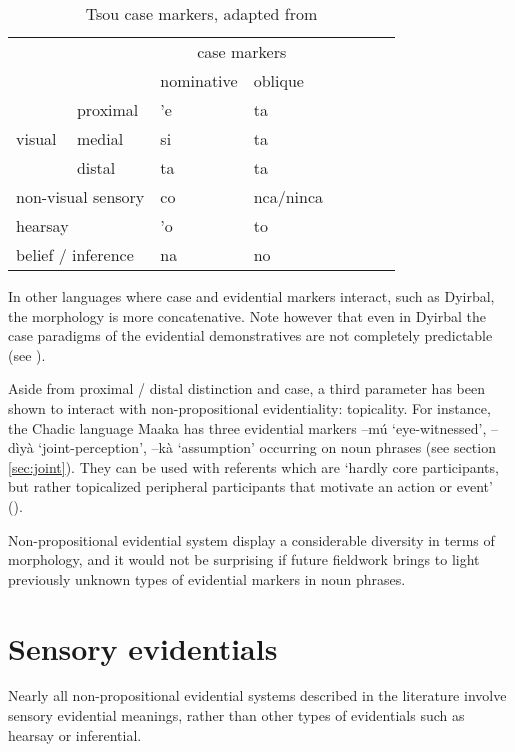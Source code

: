\documentclass[oneside,a4paper,11pt]{article}
\newcommand{\ipa}[1]{{\phon \mbox{#1}}} %
\begin{document}
\begin{table}[H]
 \caption{Tsou case markers, adapted from \citet[54]{yang00tsou.case}} \centering \label{tab:tsou}
\begin{tabular}{llllllll}
\toprule
	 & 	 & 	\multicolumn{2}{c}{case markers } 	 \\	
	 & 	 & 	nominative & 	oblique \\	
\midrule
	 & 	proximal & 	\ipa{'e} & 	\ipa{ta} \\ 	
visual	 & 	medial & 	\ipa{si} & 	\ipa{ta}  \\ 	
	 & 	distal & 	\ipa{ta} & 	\ipa{ta}  \\ 	
\multicolumn{2}{l}{non-visual sensory}  	 & 	\ipa{co} & 	\ipa{nca/ninca} \\ 	
	 \midrule
\multicolumn{2}{l}{hearsay}	 & 	\ipa{'o} & 	\ipa{to} \\ 	
\multicolumn{2}{l}{belief / inference} 	 & 	\ipa{na} & 	\ipa{no} \\ 	
\bottomrule
\end{tabular}
\end{table} 

In other languages where case and evidential markers interact, such as Dyirbal, the morphology is more concatenative. Note however that even in Dyirbal the case paradigms of the evidential demonstratives are not completely predictable (see \citealt{dixon14nonvisible}).

Aside from proximal / distal distinction and case, a third parameter has been shown to interact with non-propositional evidentiality: topicality. For instance,  the Chadic language Maaka has three evidential markers \ipa{--mú} `eye-witnessed', \ipa{--dìyà} `joint-perception', \ipa{--kà} `assumption' occurring on noun phrases (see section \ref{sec:joint}). They can be used with referents which are `hardly core participants, but rather topicalized peripheral participants that motivate an action or event' (\citealt[195-7]{storch14maaka}).

 

Non-propositional evidential system display a considerable diversity in terms of morphology, and it would not be surprising if future fieldwork brings to light previously unknown types of evidential markers in noun phrases.

\section{Sensory evidentials} \label{sec:sensory}
Nearly all non-propositional evidential systems described in the literature involve sensory evidential meanings, rather than other types of evidentials such as hearsay or inferential. 
\end{document}
